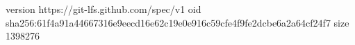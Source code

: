 version https://git-lfs.github.com/spec/v1
oid sha256:61f4a91a44667316e9eecd16e62c19e0e916c59cfe4f9fe2dcbe6a2a64cf24f7
size 1398276
